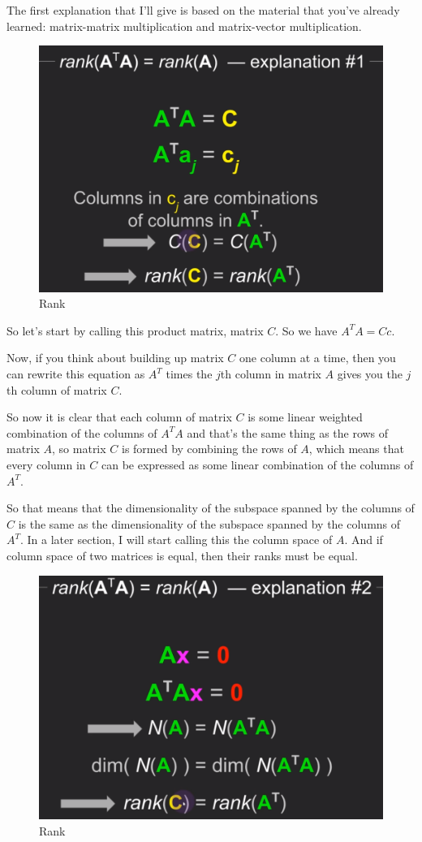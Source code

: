\documentclass[fleqn,10pt]{olplainarticle}
\theoremstyle{definition}
\theoremstyle{remark}
\begin{document}
The first explanation that I'll give is based on the material that you've already learned: matrix-matrix multiplication and matrix-vector multiplication.

\begin{figure}[ht]
	\centering
	\includegraphics[width=0.5\linewidth]{images/rank-23.png}
	\caption{Rank}
	\label{fig:rank_23}
\end{figure}

So let's start by calling this product matrix, matrix $C$. So we have $A^TA = Cc$.

Now, if you think about building up matrix $C$ one column at a time, then you can rewrite this equation as $A^T$ times the $j$th column in matrix $A$ gives you the $j$th column of matrix $C$.

So now it is clear that each column of matrix $C$ is some linear weighted combination of the columns of $A^TA$ and that's the same thing as the rows of matrix $A$, so matrix $C$ is formed by combining the rows of $A$, which means that every column in $C$ can be expressed as some linear combination of the columns of $A^T$.

So that means that the dimensionality of the subspace spanned by the columns of $C$ is the same as the dimensionality of the subspace spanned by the columns of $A^T$. In a later section, I will start calling this the column space of $A$. And if column space of two matrices is equal, then their ranks must be equal.

\begin{figure}[ht]
	\centering
	\includegraphics[width=0.5\linewidth]{images/rank-24.png}
	\caption{Rank}
	\label{fig:rank_24}
\end{figure}
\end{document}
